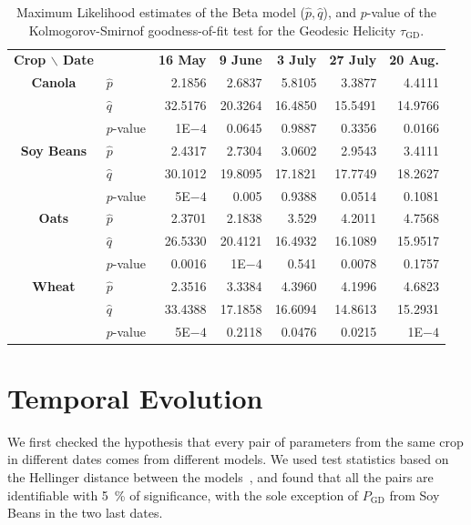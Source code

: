 \documentclass[journal]{IEEEtran}
\begin{document}
	\begin{table}[hbt]
		\centering
		\caption{Maximum Likelihood estimates of the Beta model ($\widehat p,\widehat q$), and $p$-value of the Kolmogorov-Smirnof goodness-of-fit test for the Geodesic Helicity $\tau_{\text{GD}}$.}
		\label{tab:params_helicity}
		\setlength{\tabcolsep}{3.8pt}
		\begin{tabular}{clrrrrr}
			\toprule
			\textbf{Crop $\backslash$ Date} & & \textbf{16 May} & \textbf{9 June} & \textbf{3 July} & \textbf{27 July} & \textbf{20 Aug.}\\ \cmidrule(lr){1-2} \cmidrule(lr){3-3} \cmidrule(lr){4-4} \cmidrule(lr){5-5} \cmidrule(lr){6-6} \cmidrule(lr){7-7}
			\textbf{Canola} 	
			& $\widehat{p}$ & 2.1856  	& 2.6837    & 5.8105 	& 3.3877  	& 4.4111 \\
			& $\widehat{q}$ & 32.5176 	& 20.3264 	& 16.4850 	& 15.5491 	& 14.9766\\ 
			& $p$-value 	& 1E$-4$ 		& 0.0645 	& 0.9887 	& 0.3356 	& 0.0166\\		
			\midrule
			\textbf{Soy Beans}
			& $\widehat{p}$ & 2.4317   	& 2.7304   	& 3.0602   	& 2.9543   	& 3.4111 \\
			& $\widehat{q}$ & 30.1012   & 19.8095   & 17.1821   & 17.7749   & 18.2627 \\ 
			& $p$-value 	& 5E$-4$ 	& 0.005 	& 0.9388 	& 0.0514 	& 0.1081\\			
			\midrule
			\textbf{Oats}
			& $\widehat{p}$ & 2.3701   	& 2.1838  	& 3.529     & 4.2011 	& 4.7568 \\
			& $\widehat{q}$ & 26.5330 	& 20.4121   & 16.4932 	& 16.1089  	& 15.9517 \\ 
			& $p$-value 	& 0.0016 	& 1E$-4$ 	& 0.541 	& 0.0078	& 0.1757 \\
			\midrule
			\textbf{Wheat} 
			& $\widehat{p}$ & 2.3516   	& 3.3384  	& 4.3960  	& 4.1996  	& 4.6823   \\
			& $\widehat{q}$ & 33.4388   & 17.1858   & 16.6094   & 14.8613   & 15.2931   \\
			& $p$-value 	& 5E$-4$ 	& 0.2118 	& 0.0476 	& 0.0215 	& 1E$-4$\\	
			\bottomrule
		\end{tabular}
	\end{table}
	
	\section{Temporal Evolution}
	
	We first checked the hypothesis that every pair of parameters from the same crop in different dates comes from different models.
	We used test statistics based on the Hellinger distance between the models~\cite{AnalyticExpressionsStochasticDistancesBetweenRelaxedComplexWishartDistributions}, and found that all the pairs are identifiable with \SI{5}{\percent} of significance, with the sole exception of $P_{\text{GD}}$ from Soy Beans in the two last dates.
	
\end{document}
